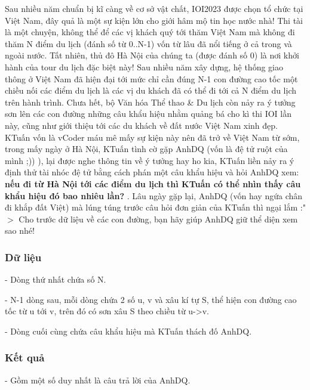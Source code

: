 







   Sau nhiều năm chuẩn bị kĩ càng về cơ sở vật chất, IOI2023 được chọn tổ chức tại Việt Nam, đây quả là một sự kiện lớn cho giới hâm mộ tin học nước nhà! Thi tài là một chuyện, không thể để các vị khách quý tới thăm Việt Nam mà không đi thăm N điểm du lịch (đánh số từ 0..N-1) vốn từ lâu đã nổi tiếng ở cả trong và ngoài nước. Tất nhiên, thủ đô Hà Nội của chúng ta (được đánh số 0) là nơi khởi hành của tour du lịch đặc biệt này! Sau nhiều năm xây dựng, hệ thống giao thông ở Việt Nam đã hiện đại tới mức chỉ cần đúng N-1 con đường cao tốc một chiều nối các điểm du lịch là các vị du khách đã có thể đi tới cả N điểm du lịch trên hành trình. Chưa hết, bộ Văn hóa Thể thao \& Du lịch còn nảy ra ý tưởng sơn lên các con đường những câu khẩu hiệu nhằm quảng bá cho kì thi IOI lần này, cũng như giới thiệu tới các du khách về đất nước Việt Nam xinh đẹp. KTuấn vốn là vCoder máu mê mấy sự kiện này nên đã trở về Việt Nam từ sớm, trong mấy ngày ở Hà Nội, KTuấn tình cờ gặp AnhDQ (vốn là đệ tử ruột của mình ;)) ), lại được nghe thông tin về ý tưởng hay ho kia, KTuấn liền nảy ra ý định thử tài nhóc đệ tử bằng cách phán một câu khẩu hiệu và hỏi AnhDQ xem:   \textbf{    nếu đi từ Hà Nội tới các điểm du lịch thì KTuấn có thể nhìn thấy câu khẩu hiệu đó bao nhiêu lần?   }   . Lâu ngày gặp lại, AnhDQ (vốn hay ngứa chân đi khắp đất Việt) mà lúng túng trước câu hỏi đơn giản của KTuấn thì ngại lắm :"$>$ Cho trước dữ liệu về các con đường, bạn hãy giúp AnhDQ giữ thể diện xem sao nhé!  

\subsubsection{   Dữ liệu  }

   - Dòng thứ nhất chứa số N.   


   - N-1 dòng sau, mỗi dòng chứa 2 số u, v và xâu kí tự S, thể hiện con đường cao tốc từ u tới v, trên đó có sơn xâu S theo chiều từ u->v.   


   - Dòng cuối cùng chứa câu khẩu hiệu mà KTuấn thách đố AnhDQ.  

\subsubsection{   Kết quả  }

   - Gồm một số duy nhất là câu trả lời của AnhDQ.  

